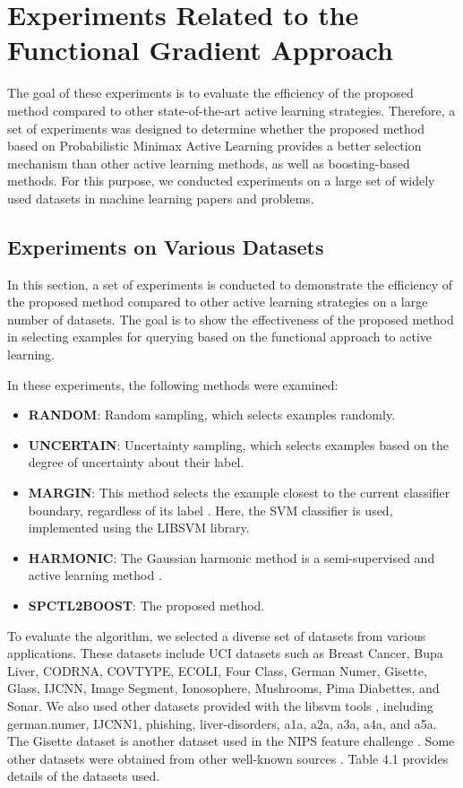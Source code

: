 	\section{Experiments Related to the Functional Gradient Approach}
	The goal of these experiments is to evaluate the efficiency of the proposed method compared to other state-of-the-art active learning strategies. Therefore, a set of experiments was designed to determine whether the proposed method based on Probabilistic Minimax Active Learning provides a better selection mechanism than other active learning methods, as well as boosting-based methods. For this purpose, we conducted experiments on a large set of widely used datasets in machine learning papers and problems.
	
	\subsection{Experiments on Various Datasets}
	In this section, a set of experiments is conducted to demonstrate the efficiency of the proposed method compared to other active learning strategies on a large number of datasets. The goal is to show the effectiveness of the proposed method in selecting examples for querying based on the functional approach to active learning.
	
	In these experiments, the following methods were examined:
	\begin{itemize}
		\item \textbf{RANDOM}: Random sampling, which selects examples randomly.
		\item \textbf{UNCERTAIN}: Uncertainty sampling, which selects examples based on the degree of uncertainty about their label.
		\item \textbf{MARGIN}: This method selects the example closest to the current classifier boundary, regardless of its label \cite{scheffer2001active}. Here, the SVM classifier is used, implemented using the LIBSVM library.
		\item \textbf{HARMONIC}: The Gaussian harmonic method is a semi-supervised and active learning method \cite{zhu2003semi}.
		\item \textbf{SPCTL2BOOST}: The proposed method.
	\end{itemize}
	
	To evaluate the algorithm, we selected a diverse set of datasets from various applications. These datasets include UCI datasets such as Breast Cancer, Bupa Liver, CODRNA, COVTYPE, ECOLI, Four Class, German Numer, Gisette, Glass, IJCNN, Image Segment, Ionosophere, Mushrooms, Pima Diabettes, and Sonar. We also used other datasets provided with the libsvm tools \cite{chang2011libsvm}, including german.numer, IJCNN1, phishing, liver-disorders, a1a, a2a, a3a, a4a, and a5a. The Gisette dataset is another dataset used in the NIPS feature challenge \cite{guyon2004result}. Some other datasets were obtained from other well-known sources \cite{newman1998uci, asuncion2007uci}. Table 4.1 provides details of the datasets used.
	
